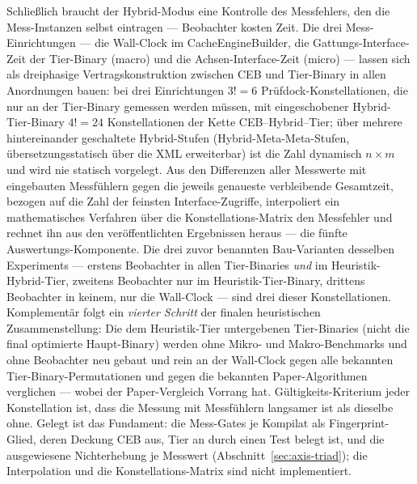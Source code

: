 \begin{nurlang}
Schließlich braucht der Hybrid-Modus eine Kontrolle des Messfehlers, den die Mess-Instanzen selbst
eintragen --- Beobachter kosten Zeit. Die drei Mess-Einrichtungen --- die Wall-Clock im
CacheEngineBuilder, die Gattungs-Interface-Zeit der Tier-Binary (macro) und die Achsen-Interface-Zeit
(micro) --- lassen sich als dreiphasige Vertragskonstruktion zwischen CEB und Tier-Binary in allen
Anordnungen bauen: bei drei Einrichtungen $3! = 6$ Prüfdock-Konstellationen, die nur an der Tier-Binary
gemessen werden müssen, mit eingeschobener Hybrid-Tier-Binary $4! = 24$ Konstellationen der Kette
CEB--Hybrid--Tier; über mehrere hintereinander geschaltete Hybrid-Stufen (Hybrid-Meta-Meta-Stufen,
übersetzungsstatisch über die XML erweiterbar) ist die Zahl dynamisch $n \times m$ und wird nie statisch
vorgelegt. Aus den Differenzen aller Messwerte mit eingebauten Messfühlern gegen die jeweils genaueste
verbleibende Gesamtzeit, bezogen auf die Zahl der feinsten Interface-Zugriffe, interpoliert ein
mathematisches Verfahren über die Konstellations-Matrix den Messfehler und rechnet ihn aus den
veröffentlichten Ergebnissen heraus --- die fünfte Auswertungs-Komponente. Die drei zuvor benannten
Bau-Varianten desselben Experiments --- erstens Beobachter in allen Tier-Binaries \emph{und} im
Heuristik-Hybrid-Tier, zweitens Beobachter nur im Heuristik-Tier-Binary, drittens Beobachter in keinem,
nur die Wall-Clock --- sind drei dieser Konstellationen. Komplementär folgt ein \emph{vierter Schritt}
der finalen heuristischen Zusammenstellung: Die dem Heuristik-Tier untergebenen Tier-Binaries (nicht die
final optimierte Haupt-Binary) werden ohne Mikro- und Makro-Benchmarks und ohne Beobachter neu gebaut und
rein an der Wall-Clock gegen alle bekannten Tier-Binary-Permutationen und gegen die bekannten
Paper-Algorithmen verglichen --- wobei der Paper-Vergleich Vorrang hat. Gültigkeits-Kriterium jeder
Konstellation ist, dass die Messung mit Messfühlern langsamer ist als dieselbe ohne. Gelegt ist das
Fundament: die Mess-Gates je Kompilat als Fingerprint-Glied, deren Deckung CEB aus, Tier an durch einen Test
belegt ist, und die ausgewiesene Nichterhebung je Messwert (Abschnitt~\ref{sec:axis-triad}); die
Interpolation und die Konstellations-Matrix sind nicht implementiert.


\end{nurlang}
